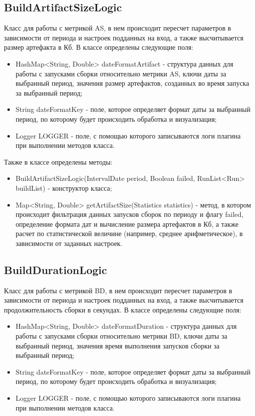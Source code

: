 \subsection{BuildArtifactSizeLogic}

Класс для работы с метрикой AS, в нем происходит пересчет параметров в зависимости от периода и настроек подданных на вход, а также высчитывается размер артефакта в Кб. В классе определены следующие поля:

\begin{itemize}
	\item HashMap<String, Double> dateFormatArtifact - структура данных для работы с запусками сборки относительно метрики AS, ключи даты за выбранный период, значения размер артефактов, созданных во время запуска за выбранный период;
	\item String dateFormatKey - поле, которое определяет формат даты за выбранный период, по которому будет происходить обработка и визуализация;
	\item Logger LOGGER - поле, с помощью которого записываются логи плагина при выполнении методов класса.
\end{itemize}

Также в классе определены методы:

\begin{itemize}
	\item BuildArtifactSizeLogic(IntervalDate period, Boolean failed, RunList<Run> buildList) - конструктор класса;
	\item Map<String, Double> getArtifactSize(Statistics statistics) - метод, в котором происходит фильтрация данных запусков сборок по периоду и флагу failed, определение формата дат и вычисление размера артефактов в Кб, а также расчет по статистической величине (например, среднее арифметическое), в зависимости от заданных настроек.
\end{itemize}

\subsection{BuildDurationLogic}

Класс для работы с метрикой BD, в нем происходит пересчет параметров в зависимости от периода и настроек подданных на вход, а также высчитывается продолжительность сборки в секундах. В классе определены следующие поля:

\begin{itemize}
	\item HashMap<String, Double> dateFormatDuration - структура данных для работы с запусками сборки относительно метрики BD, ключи даты за выбранный период, значения время выполнения запусков сборки за выбранный период;
	\item String dateFormatKey - поле, которое определяет формат даты за выбранный период, по которому будет происходить обработка и визуализация;
	\item Logger LOGGER - поле, с помощью которого записываются логи плагина при выполнении методов класса.
\end{itemize}

